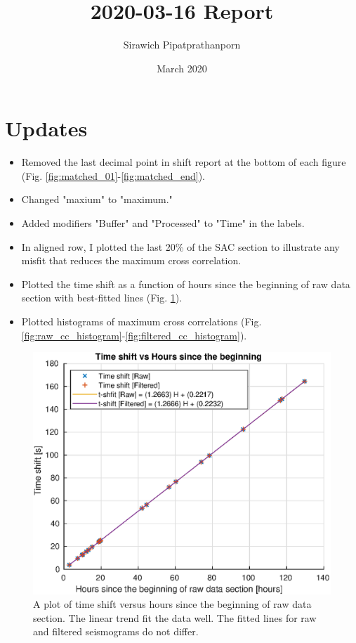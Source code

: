 \documentclass[11pt,letterpaper]{article}
\title{2020-03-16 Report}
\author{Sirawich Pipatprathanporn}
\date{March 2020}
\begin{document}
\maketitle

\section{Updates}
\begin{itemize}
    \item Removed the last decimal point in shift report at the bottom of each figure (Fig. \ref{fig:matched_01}-\ref{fig:matched_end}).
    \item Changed "maxium" to "maximum."
    \item Added modifiers "Buffer" and "Processed" to "Time" in the labels.
    \item In aligned row, I plotted the last 20\% of the SAC section to illustrate any misfit that reduces the maximum cross correlation.
    \item Plotted the time shift as a function of hours since the beginning of raw data section with best-fitted lines (Fig. \ref{fig:timeshift_vs_hours}).
    \item Plotted histograms of maximum cross correlations (Fig. \ref{fig:raw_cc_histogram}-\ref{fig:filtered_cc_histogram}).
\end{itemize}

\begin{figure}
    \centering
    \includegraphics[width=0.7\linewidth]{Figures/Plots/timeshift_vs_hours_since_beginning.eps}
    \caption{A plot of time shift versus hours since the beginning of raw data section. The linear trend fit the data well. The fitted lines for raw and filtered seismograms do not differ.}
    \label{fig:timeshift_vs_hours}
\end{figure}
\end{document}
